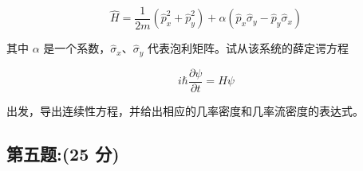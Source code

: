 \begin{equation}
    \hat{H} = \frac{1}{2m} \left( \hat{p}_x^2 + \hat{p}_y^2 \right) + \alpha \left( \hat{p}_x \hat{\sigma}_y - \hat{p}_y \hat{\sigma}_x \right)~
\end{equation}

其中 $\alpha$ 是一个系数，$\hat{\sigma}_x$、$\hat{\sigma}_y$ 代表泡利矩阵。试从该系统的薛定谔方程

\begin{equation}
    i \hbar \frac{\partial \psi}{\partial t} = H \psi~
\end{equation}

出发，导出连续性方程，并给出相应的几率密度和几率流密度的表达式。
\subsection{第五题:(25 分)}
